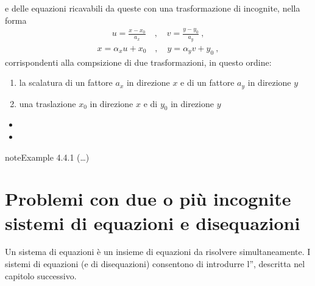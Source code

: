 \documentclass[letterpaper,10pt,italian]{jupyterBook}
\begin{document}
\sphinxAtStartPar
e delle equazioni ricavabili da queste con una trasformazione  di incognite, nella forma
\begin{equation*}
\begin{split} u = \frac{x-x_0}{a_x} \quad , \quad v = \frac{y-y_0}{a_y} \ ,\end{split}
\end{equation*}\begin{equation*}
\begin{split} x = \alpha_x u + x_0  \quad , \quad y = \alpha_y v + y_0 \ ,\end{split}
\end{equation*}
\sphinxAtStartPar
corrispondenti alla compsizione di due trasformazioni, in questo ordine:
\begin{enumerate}
%
\item {} 
\sphinxAtStartPar
la scalatura di un fattore \(a_x\) in direzione \(x\) e di un fattore \(a_y\) in direzione \(y\)

\item {} 
\sphinxAtStartPar
una traslazione \(x_0\) in direzione \(x\) e di \(y_0\) in direzione \(y\)

\end{enumerate}

\sphinxAtStartPar
{}
\begin{itemize}
\item {} 
\sphinxAtStartPar
{}

\item {} 
\sphinxAtStartPar
{}

\end{itemize}
\label{ch/algebra/real-algebra:example-3}
\begin{sphinxadmonition}{note}{Example 4.4.1 (…)}


\end{sphinxadmonition}


\section{Problemi con due o più incognite \sphinxhyphen{} sistemi di equazioni e disequazioni}
\label{\detokenize{ch/algebra/real-algebra:problemi-con-due-o-piu-incognite-sistemi-di-equazioni-e-disequazioni}}
\sphinxAtStartPar
Un sistema di equazioni è un insieme di equazioni da risolvere simultaneamente. I sistemi di equazioni (e di disequazioni) consentono di introdurre l”{\hyperref[\detokenize{ch/algebra/real-n-algebra:math-hs-algebra-real-n}]{}}, descritta nel capitolo successivo.
\end{document}
